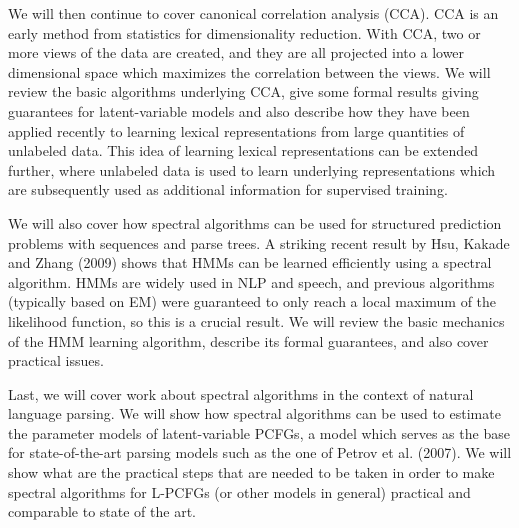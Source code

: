 We will then continue to cover canonical correlation analysis (CCA). CCA is an early method from statistics for dimensionality reduction. With CCA, two or more views of the data are created, and they are all projected into a lower dimensional space which maximizes the correlation between the views. We will review the basic algorithms underlying CCA, give some formal results giving guarantees for latent-variable models and also describe how they have been applied recently to learning lexical representations from large quantities of unlabeled data. This idea of learning lexical representations can be extended further, where unlabeled data is used to learn underlying representations which are subsequently used as additional information for supervised training.

We will also cover how spectral algorithms can be used for structured prediction problems with sequences and parse trees. A striking recent result by Hsu, Kakade and Zhang (2009) shows that HMMs can be learned efficiently using a spectral algorithm. HMMs are widely used in NLP and speech, and previous algorithms (typically based on EM) were guaranteed to only reach a local maximum of the likelihood function, so this is a crucial result. We will review the basic mechanics of the HMM learning algorithm, describe its formal guarantees, and also cover practical issues.

Last, we will cover work about spectral algorithms in the context of natural language parsing. We will show how spectral algorithms can be used to estimate the parameter models of latent-variable PCFGs, a model which serves as the base for state-of-the-art parsing models such as the one of Petrov et al. (2007). We will show what are the practical steps that are needed to be taken in order to make spectral algorithms for L-PCFGs (or other models in general) practical and comparable to state of the art.
